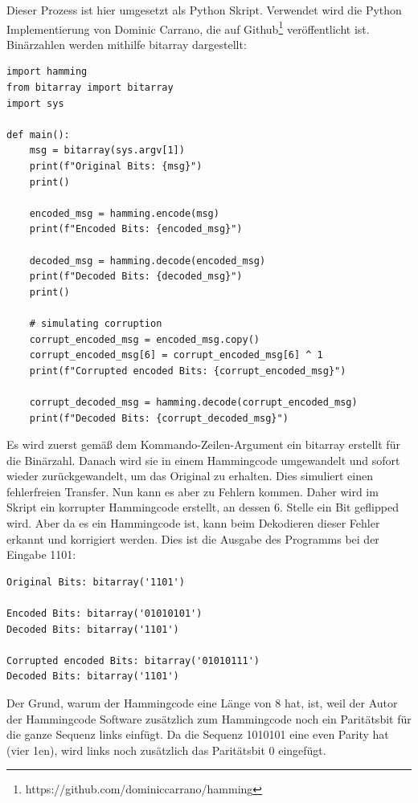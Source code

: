 Dieser Prozess ist hier umgesetzt als Python Skript. Verwendet wird die Python Implementierung von Dominic Carrano, die auf
Github\footnote{https://github.com/dominiccarrano/hamming} veröffentlicht ist. Binärzahlen werden mithilfe bitarray dargestellt:
\begin{lstlisting}
import hamming
from bitarray import bitarray
import sys

def main():
    msg = bitarray(sys.argv[1])
    print(f"Original Bits: {msg}")
    print()

    encoded_msg = hamming.encode(msg)
    print(f"Encoded Bits: {encoded_msg}")

    decoded_msg = hamming.decode(encoded_msg)
    print(f"Decoded Bits: {decoded_msg}")
    print()

    # simulating corruption
    corrupt_encoded_msg = encoded_msg.copy()
    corrupt_encoded_msg[6] = corrupt_encoded_msg[6] ^ 1
    print(f"Corrupted encoded Bits: {corrupt_encoded_msg}")

    corrupt_decoded_msg = hamming.decode(corrupt_encoded_msg)
    print(f"Decoded Bits: {corrupt_decoded_msg}")
\end{lstlisting}
Es wird zuerst gemäß dem Kommando-Zeilen-Argument ein bitarray erstellt für die Binärzahl. Danach wird sie in einem
Hammingcode umgewandelt und sofort wieder zurückgewandelt, um das Original zu erhalten. Dies simuliert einen fehlerfreien
Transfer. Nun kann es aber zu Fehlern kommen. Daher wird im Skript ein korrupter Hammingcode erstellt, an dessen 6. Stelle
ein Bit geflipped wird. Aber da es ein Hammingcode ist, kann beim Dekodieren dieser Fehler erkannt und korrigiert werden.
Dies ist die Ausgabe des Programms bei der Eingabe 1101:
\begin{lstlisting}
Original Bits: bitarray('1101')

Encoded Bits: bitarray('01010101')
Decoded Bits: bitarray('1101')

Corrupted encoded Bits: bitarray('01010111')
Decoded Bits: bitarray('1101')
\end{lstlisting}
Der Grund, warum der Hammingcode eine Länge von 8 hat, ist, weil der Autor der Hammingcode Software zusätzlich
zum Hammingcode noch ein Paritätsbit für die ganze Sequenz links einfügt. Da die Sequenz 1010101 eine even Parity hat (vier 1en),
wird links noch zusätzlich das Paritätsbit 0 eingefügt.





